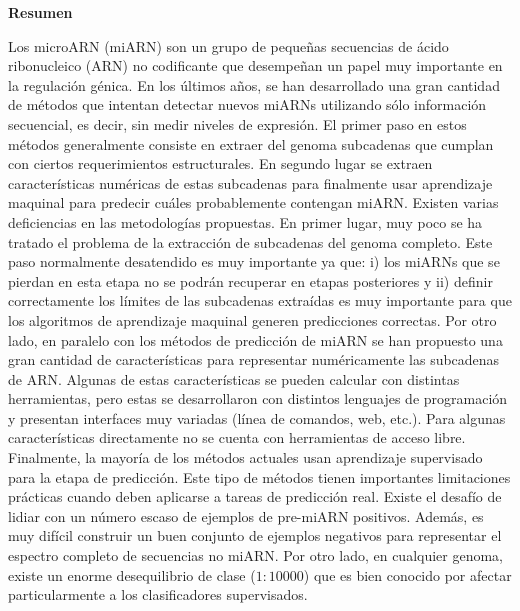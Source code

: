 \newpage
\thispagestyle{empty}

\vspace{3cm}
\begin{center}
{\huge \textbf{Resumen}}
\end{center}
\vspace{1cm}

Los microARN (miARN) son un grupo de pequeñas secuencias de ácido ribonucleico (ARN) no codificante que desempeñan un papel muy importante en la
regulación génica. En los últimos años, se han desarrollado una gran cantidad de métodos que intentan detectar nuevos miARNs utilizando sólo información
secuencial, es decir, sin medir niveles de expresión. El primer paso en estos métodos generalmente consiste en extraer del genoma subcadenas que cumplan con
ciertos requerimientos estructurales. En segundo lugar se extraen características numéricas de estas subcadenas para finalmente usar aprendizaje maquinal
para predecir cuáles probablemente contengan miARN. Existen varias deficiencias en las metodologías propuestas. En primer lugar, muy poco se ha tratado el
problema de la extracción de subcadenas del genoma completo. Este paso normalmente desatendido es muy importante ya que: i) los miARNs que se pierdan en esta
etapa no se podrán recuperar en etapas posteriores y ii) definir correctamente los límites de las subcadenas extraídas es muy importante para que los
algoritmos de aprendizaje maquinal generen predicciones correctas. Por otro lado, en paralelo con los métodos de predicción de miARN se han propuesto una gran
cantidad de características para representar numéricamente las subcadenas de ARN. Algunas de estas características se pueden calcular con distintas
herramientas, pero estas se desarrollaron con distintos lenguajes de programación y presentan interfaces muy variadas (línea de comandos, web, etc.). Para
algunas características directamente no se cuenta con herramientas de acceso libre. Finalmente, la mayoría de los métodos actuales usan aprendizaje
supervisado para la etapa de predicción. Este tipo de métodos tienen importantes limitaciones prácticas cuando deben aplicarse a tareas de predicción real.
Existe el desafío de lidiar con un número escaso de ejemplos de pre-miARN positivos. Además, es muy difícil construir un buen conjunto de
ejemplos negativos para representar el espectro completo de secuencias no miARN. Por otro lado, en cualquier genoma, existe un enorme desequilibrio de clase
($1:10000$) que es bien conocido por afectar particularmente a los clasificadores supervisados.

